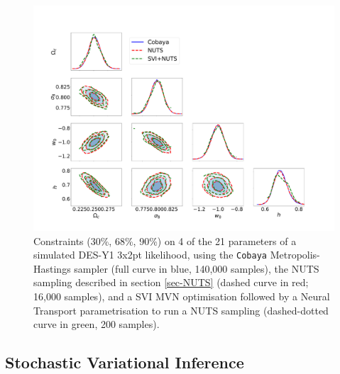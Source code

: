 \documentclass[twocolumn,twocolappendix,nofootinbib,iop]{openjournal}
\newcommand{\JZ}[1]{{\color{purple}JZ: #1}}
\newcommand{\resubnote}[1]{#1} %
\begin{document}

%
\begin{figure}
\centering
\includegraphics[width=1.5\columnwidth]{figures/fig_Cobaya-NUTS-SVI200_v1.pdf}
\caption{Constraints (30\%, 68\%, 90\%) on 4 of the 21 parameters of a simulated DES-Y1 3x2pt likelihood, using the \texttt{Cobaya} Metropolis-Hastings sampler (full curve in blue, \resubnote{140,000} samples), the  NUTS sampling described in section \ref{sec-NUTS} (dashed curve in red; 16,000 samples), and a SVI MVN optimisation followed by a Neural Transport parametrisation to run a NUTS sampling (dashed-dotted curve in green, 200 samples).}
\label{fig_cobaya_NUTS_SVI}
\end{figure}



\subsection{Stochastic Variational Inference}
\label{sec-SVI}
%
\end{document}

